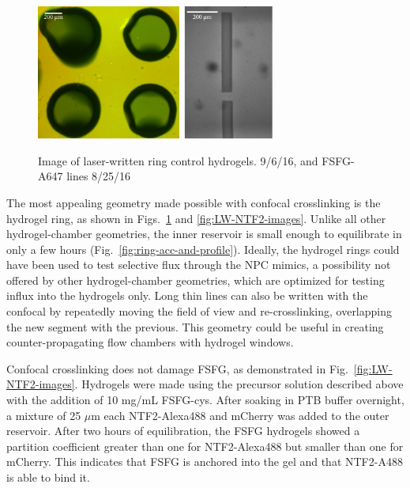 \begin{figure} %
\caption{Image of laser-written ring control hydrogels. 9/6/16, and FSFG-A647 lines 8/25/16}
\centering
\includegraphics[width=0.7\textwidth]{figs/ch03/example-LW-gels}
\label{fig:LW-gel-images}
\end{figure} %

The most appealing geometry made possible with confocal crosslinking is the hydrogel ring, as shown in Figs.~\ref{fig:LW-gel-images} and \ref{fig:LW-NTF2-images}.  Unlike all other hydrogel-chamber geometries, the inner reservoir is small enough to equilibrate in only a few hours (Fig.~\ref{fig:ring-acc-and-profile}).  Ideally, the hydrogel rings could have been used to test selective flux through the NPC mimics, a possibility not offered by other hydrogel-chamber geometries, which are optimized for testing influx into the hydrogels only.  Long thin lines can also be written with the confocal by repeatedly moving the field of view and re-crosslinking, overlapping the new segment with the previous.  This geometry could be useful in creating counter-propagating flow chambers with hydrogel windows.

Confocal crosslinking does not damage FSFG, as demonstrated in Fig.~\ref{fig:LW-NTF2-images}.  Hydrogels were made using the precursor solution described above with the addition of 10 mg/mL FSFG-cys.  After soaking in PTB buffer overnight, a mixture of 25 $\mu$m each NTF2-Alexa488 and mCherry was added to the outer reservoir.  After two hours of equilibration, the FSFG hydrogels showed a partition coefficient greater than one for NTF2-Alexa488 but smaller than one for mCherry.  This indicates that FSFG is anchored into the gel and that NTF2-A488 is able to bind it.

